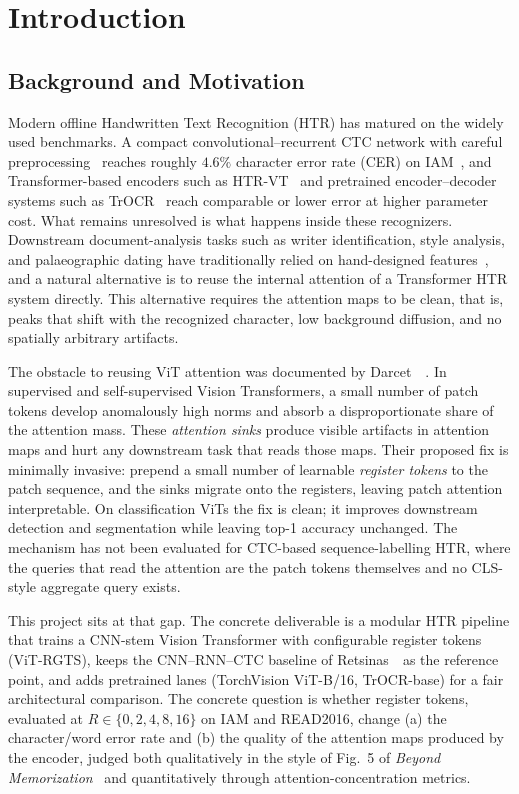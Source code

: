 \section{Introduction}
\label{sec:introduction}

\subsection{Background and Motivation}
\label{sec:background}

Modern offline Handwritten Text Recognition (HTR) has matured on the widely used benchmarks. A compact convolutional--recurrent CTC network with careful preprocessing~\cite{retsinas2024htrbestpractices} reaches roughly $4.6\%$ character error rate (CER) on IAM~\cite{marti2002iam}, and Transformer-based encoders such as HTR-VT~\cite{li2024htrvt} and pretrained encoder--decoder systems such as TrOCR~\cite{li2023trocr} reach comparable or lower error at higher parameter cost. What remains unresolved is what happens inside these recognizers. Downstream document-analysis tasks such as writer identification, style analysis, and palaeographic dating have traditionally relied on hand-designed features~\cite{raven2025vlac}, and a natural alternative is to reuse the internal attention of a Transformer HTR system directly. This alternative requires the attention maps to be clean, that is, peaks that shift with the recognized character, low background diffusion, and no spatially arbitrary artifacts.

The obstacle to reusing ViT attention was documented by Darcet~\etal~\cite{darcet2024registers}. In supervised and self-supervised Vision Transformers, a small number of patch tokens develop anomalously high norms and absorb a disproportionate share of the attention mass. These \emph{attention sinks} produce visible artifacts in attention maps and hurt any downstream task that reads those maps. Their proposed fix is minimally invasive: prepend a small number of learnable \emph{register tokens} to the patch sequence, and the sinks migrate onto the registers, leaving patch attention interpretable. On classification ViTs the fix is clean; it improves downstream detection and segmentation while leaving top-1 accuracy unchanged. The mechanism has not been evaluated for CTC-based sequence-labelling HTR, where the queries that read the attention are the patch tokens themselves and no CLS-style aggregate query exists.

This project sits at that gap. The concrete deliverable is a modular HTR pipeline that trains a CNN-stem Vision Transformer with configurable register tokens (ViT-RGTS), keeps the CNN--RNN--CTC baseline of Retsinas~\etal\ as the reference point, and adds pretrained lanes (TorchVision ViT-B/16, TrOCR-base) for a fair architectural comparison. The concrete question is whether register tokens, evaluated at $R \in \{0, 2, 4, 8, 16\}$ on IAM and READ2016, change (a) the character/word error rate and (b) the quality of the attention maps produced by the encoder, judged both qualitatively in the style of Fig.~5 of \emph{Beyond Memorization}~\cite{gurav2025beyondmem} and quantitatively through attention-concentration metrics.

